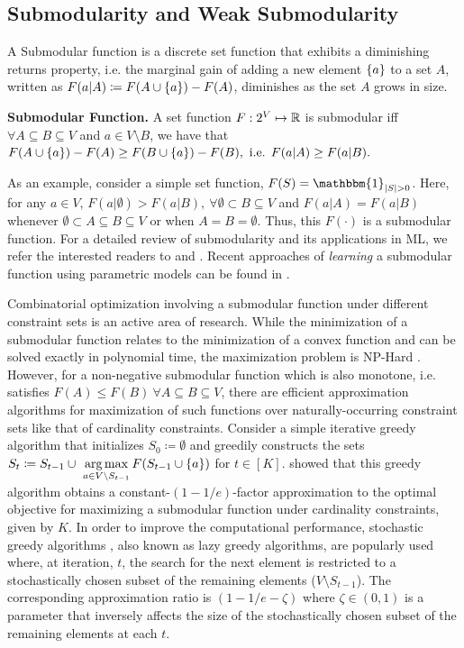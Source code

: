 \subsection{Submodularity and Weak Submodularity}\label{prelim:subm}
A Submodular function is a discrete set function that exhibits a diminishing returns property, i.e. the marginal gain of adding a new element $\{a\}$ to a set $A$, written as $F(a|A)\coloneqq F(A\cup \{a\})-F(A)$, diminishes as the set $A$ grows in size.
\begin{definitionBox}
\begin{definition}{\textbf{Submodular Function.}}\label{defn:subm}\newline
A set function $F:2^V\mapsto \mathbb{R}$ is submodular iff $\forall A \subseteq B \subseteq V$ and $a\in V\setminus B$, we have that $F(A\cup \{a\})-F(A) \geq F(B\cup \{a\})-F(B), \textup{ i.e. } F(a|A)\geq F(a|B).$
\end{definition}
\end{definitionBox}
As an example, consider a simple set function, $F(S)= \mathbbm{1}_{|S|>0}$. Here, for any $a\in V$, $F(a|\emptyset)> F(a|B),\ \forall \emptyset\subset B \subseteq V$ and $F(a|A)=F(a|B)$ whenever $\emptyset \subset A\subseteq B\subseteq V$ or when $A=B=\emptyset$. Thus, this $F(\cdot)$ is a submodular function. For a detailed review of submodularity and its applications in ML, we refer the interested readers to \citet[Chapter (44)]{matroid} and \cite{Bach2011LearningWS}. Recent approaches of \textit{learning} a submodular function using parametric models can be found in \cite{dsf,sea-nn,de2022neural,extDSF}.

Combinatorial optimization involving a submodular function under different constraint sets is an active area of research. While the minimization of a submodular function relates to the minimization of a convex function and can be solved exactly in polynomial time, the maximization problem is NP-Hard \citep{Bach2011LearningWS}. However, for a non-negative submodular function which is also monotone, i.e. satisfies $F(A)\leq F(B)\ \forall A\subseteq B\subseteq V$, there are efficient approximation algorithms for maximization of such functions over naturally-occurring constraint sets like that of cardinality constraints. Consider a simple iterative greedy algorithm that initializes $S_0\coloneqq \emptyset$ and greedily constructs the sets $S_t \coloneqq  S_{t-1}\cup \ \mathop{\rm arg\,max}\limits_{a\in V\setminus S_{t-1}} F(S_{t-1}\cup \{a\})$ for $t\in [K]$. \cite{DBLP:journals/mp/NemhauserWF78} showed that this greedy algorithm obtains a constant-$(1-1/e)$-factor approximation to the optimal objective for maximizing a submodular function under cardinality constraints, given by $K$. In order to improve the computational performance, stochastic greedy algorithms \citep{mirzasoleiman15a}, also known as lazy greedy algorithms, are popularly used where, at iteration, $t$, the search for the next element is restricted to a stochastically chosen subset of the remaining elements ($V\setminus S_{t-1}$). The corresponding approximation ratio is $(1-1/e-\zeta)$ where $\zeta\in (0, 1)$ is a parameter that inversely affects the size of the stochastically chosen subset of the remaining elements at each $t$.

